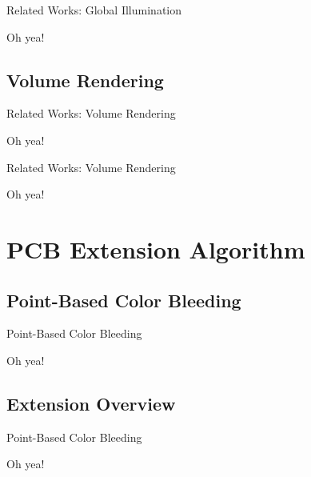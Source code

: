 \documentclass{beamer}
\begin{document}
\begin{frame}{Related Works: Global Illumination}

    Oh yea!

\end{frame}




\subsection{Volume Rendering}
\begin{frame}{Related Works: Volume Rendering}

    Oh yea!

\end{frame}




\begin{frame}{Related Works: Volume Rendering}

    Oh yea!

\end{frame}




\section{PCB Extension Algorithm}
\subsection{Point-Based Color Bleeding}
\begin{frame}{Point-Based Color Bleeding}

    Oh yea!

\end{frame}




\subsection{Extension Overview}
\begin{frame}{Point-Based Color Bleeding}

    Oh yea!

\end{frame}
\end{document}

